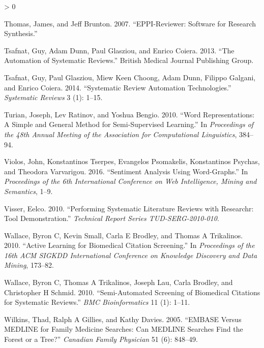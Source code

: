 \documentclass{article}
\newlength{\cslhangindent}
\newenvironment{CSLReferences}[2] %
 {%
  \setlength{\parindent}{0pt}
  \ifodd #1 \everypar{\setlength{\hangindent}{\cslhangindent}}\ignorespaces\fi
  \ifnum #2 > 0
  \setlength{\parskip}{#2\baselineskip}
  \fi
 }%
 {}
\begin{document}
\begin{CSLReferences}{1}{0}
\leavevmode\hypertarget{ref-thomas2007eppi}{}%
Thomas, James, and Jeff Brunton. 2007. {``EPPI-Reviewer: Software for
Research Synthesis.''}

\leavevmode\hypertarget{ref-tsafnat2013automation}{}%
Tsafnat, Guy, Adam Dunn, Paul Glasziou, and Enrico Coiera. 2013. {``The
Automation of Systematic Reviews.''} British Medical Journal Publishing
Group.

\leavevmode\hypertarget{ref-tsafnat2014systematic}{}%
Tsafnat, Guy, Paul Glasziou, Miew Keen Choong, Adam Dunn, Filippo
Galgani, and Enrico Coiera. 2014. {``Systematic Review Automation
Technologies.''} \emph{Systematic Reviews} 3 (1): 1--15.

\leavevmode\hypertarget{ref-turian2010word}{}%
Turian, Joseph, Lev Ratinov, and Yoshua Bengio. 2010. {``Word
Representations: A Simple and General Method for Semi-Supervised
Learning.''} In \emph{Proceedings of the 48th Annual Meeting of the
Association for Computational Linguistics}, 384--94.

\leavevmode\hypertarget{ref-violos2016sentiment}{}%
Violos, John, Konstantinos Tserpes, Evangelos Psomakelis, Konstantinos
Psychas, and Theodora Varvarigou. 2016. {``Sentiment Analysis Using
Word-Graphs.''} In \emph{Proceedings of the 6th International Conference
on Web Intelligence, Mining and Semantics}, 1--9.

\leavevmode\hypertarget{ref-visser2010performing}{}%
Visser, Eelco. 2010. {``Performing Systematic Literature Reviews with
Researchr: Tool Demonstration.''} \emph{Technical Report Series
TUD-SERG-2010-010}.

\leavevmode\hypertarget{ref-wallace2010active}{}%
Wallace, Byron C, Kevin Small, Carla E Brodley, and Thomas A Trikalinos.
2010. {``Active Learning for Biomedical Citation Screening.''} In
\emph{Proceedings of the 16th ACM SIGKDD International Conference on
Knowledge Discovery and Data Mining}, 173--82.

\leavevmode\hypertarget{ref-wallace2010semi}{}%
Wallace, Byron C, Thomas A Trikalinos, Joseph Lau, Carla Brodley, and
Christopher H Schmid. 2010. {``Semi-Automated Screening of Biomedical
Citations for Systematic Reviews.''} \emph{BMC Bioinformatics} 11 (1):
1--11.

\leavevmode\hypertarget{ref-wilkins2005embase}{}%
Wilkins, Thad, Ralph A Gillies, and Kathy Davies. 2005. {``EMBASE Versus
MEDLINE for Family Medicine Searches: Can MEDLINE Searches Find the
Forest or a Tree?''} \emph{Canadian Family Physician} 51 (6): 848--49.


\end{CSLReferences}
\end{document}
